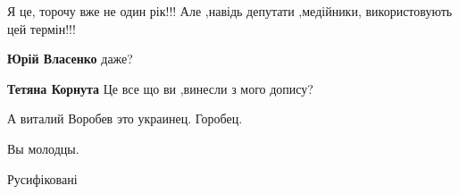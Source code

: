 \begin{itemize}
 

Я це, торочу вже не один рік!!! Але ,навідь депутати ,медійники, використовують
цей термін!!!

\begin{itemize}
 
\textbf{Юрій Власенко} даже?\Laughey[1.0][white]

 
\textbf{Тетяна Корнута} Це все що ви ,винесли з мого допису?
\end{itemize}

 
А виталий Воробев это украинец. Горобец.

 
Вы молодцы.

 
Русифіковані

 

\end{itemize}
